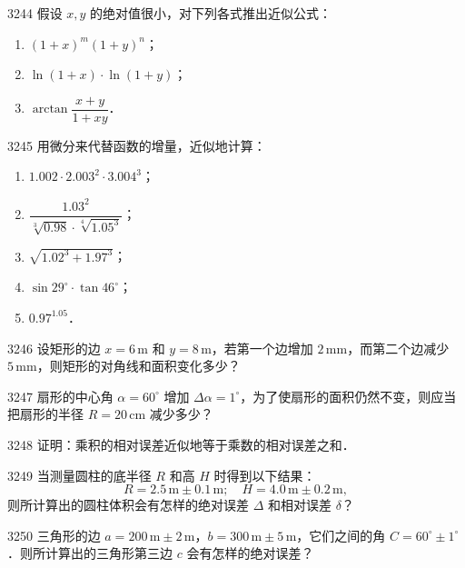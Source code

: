 \begin{prob}[L]{3244}
假设 $x, y$ 的绝对值很小，对下列各式推出近似公式：
\begin{enumerate}[label=(\alph*), itemsep=2pt, topsep=3pt]
\item $(1+x)^m (1+y)^n$；
\item $\ln(1+x)\cdot \ln(1+y)$；
\item $\arctan\dfrac{x+y}{1+xy}$．
\end{enumerate}
\end{prob}

\begin{prob}[L]{3245}
用微分来代替函数的增量，近似地计算：
\begin{enumerate}[label=(\alph*), itemsep=2pt, topsep=3pt]
\item $1.002 \cdot 2.003^2 \cdot 3.004^3$；
\item $\dfrac{1.03^2}{\sqrt[3]{0.98} \cdot \sqrt[4]{1.05^3}}$；
\item $\sqrt{1.02^3 + 1.97^3}$；
\item $\sin 29^\circ \cdot \tan 46^\circ$；
\item $0.97^{1.05}$．
\end{enumerate}
\end{prob}

\begin{prob}[M]{3246}
设矩形的边 $x = 6\,\mathrm{m}$ 和 $y = 8\,\mathrm{m}$，若第一个边增加 $2\,\mathrm{mm}$，而第二个边减少 $5\,\mathrm{mm}$，则矩形的对角线和面积变化多少？
\end{prob}

\begin{prob}[M]{3247}
扇形的中心角 $\alpha = 60^\circ$ 增加 $\Delta\alpha = 1^\circ$，为了使扇形的面积仍然不变，则应当把扇形的半径 $R = 20\,\mathrm{cm}$ 减少多少？
\end{prob}

\begin{prob}[M]{3248}
证明：乘积的相对误差近似地等于乘数的相对误差之和．
\end{prob}

\begin{prob}[M]{3249}
当测量圆柱的底半径 $R$ 和高 $H$ 时得到以下结果：
\[
R = 2.5\,\mathrm{m} \pm 0.1\,\mathrm{m}; \quad H = 4.0\,\mathrm{m} \pm 0.2\,\mathrm{m},
\]
则所计算出的圆柱体积会有怎样的绝对误差 $\Delta$ 和相对误差 $\delta$？
\end{prob}

\begin{prob}[M]{3250}
三角形的边 $a = 200\,\mathrm{m} \pm 2\,\mathrm{m}$，$b = 300\,\mathrm{m} \pm 5\,\mathrm{m}$，它们之间的角 $C = 60^\circ \pm 1^\circ$．则所计算出的三角形第三边 $c$ 会有怎样的绝对误差？
\end{prob}

